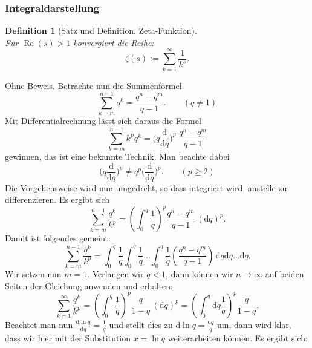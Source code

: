 \documentclass[a4paper,10pt,fleqn,twocolumn,twoside]{scrartcl}
\numberwithin{equation}{section}
\DeclareMathOperator{\real}{Re}
\theoremstyle{rmbox}
\newtheorem{definition}{Definition}
\begin{document}
\subsubsection{Integraldarstellung}
\begin{definition}[Satz und Definition. Zeta-Funktion]\mbox{}\\
Für $\real(s)>1$ konvergiert die Reihe:
\begin{equation}
\zeta(s) := \sum_{k=1}^\infty \frac{1}{k^s}.
\end{equation}
\end{definition}
Ohne Beweis. Betrachte nun die Summenformel
\begin{equation}
\sum_{k=m}^{n-1} q^k = \frac{q^n-q^m}{q-1}.\qquad (q\ne 1)
\end{equation}
Mit Differentialrechnung lässt sich daraus die Formel
\begin{equation}
\sum_{k=m}^{n-1} k^p q^k 
= \Big(q\frac{\mathrm d}{\mathrm dq}\Big)^p\;\frac{q^n-q^m}{q-1}
\end{equation}
gewinnen, das ist eine bekannte Technik. Man beachte dabei
\begin{equation}
\Big(q\frac{\mathrm d}{\mathrm dq}\Big)^p
\ne q^p \Big(\frac{\mathrm d}{\mathrm dq}\Big)^p.\qquad (p\ge 2)
\end{equation}
Die Vorgehensweise wird nun umgedreht, so dass integriert wird,
anstelle zu differenzieren. Es ergibt sich%
\begin{equation}
\sum_{k=m}^{n-1} \frac{q^k}{k^p}
= \left(\int_0^q \frac{1}{q}\right)^p \frac{q^n-q^m}{q-1}\,(\mathrm dq)^p.
\end{equation}
Damit ist folgendes gemeint:
\begin{equation}
\sum_{k=m}^{n-1} \frac{q^k}{k^p}
= \int_0^q \frac{1}{q}\int_0^q \frac{1}{q}\ldots\int_0^q \frac{1}{q}
\left(\frac{q^n-q^m}{q-1}\right)\,\mathrm dq\mathrm dq\ldots\mathrm dq.
\end{equation}
Wir setzen nun $m=1$. Verlangen wir $q<1$, dann können wir $n\to\infty$
auf beiden Seiten der Gleichung anwenden und erhalten:%
\begin{equation}
\sum_{k=1}^\infty \frac{q^k}{k^p}
= \left(\int_0^q \frac{1}{q}\right)^p \frac{q}{1-q}\,(\mathrm dq)^p
= \left(\int_0^q \mathrm dq \frac{1}{q}\right)^p \frac{q}{1-q}.
\end{equation}
Beachtet man nun $\frac{\mathrm d\ln q}{\mathrm dq}=\frac{1}{q}$
und stellt dies zu $\mathrm d\ln q = \frac{\mathrm dq}{q}$ um,
dann wird klar, dass wir hier mit der Substitution $x=\ln q$
weiterarbeiten können. Es ergibt sich:%
\end{document}
